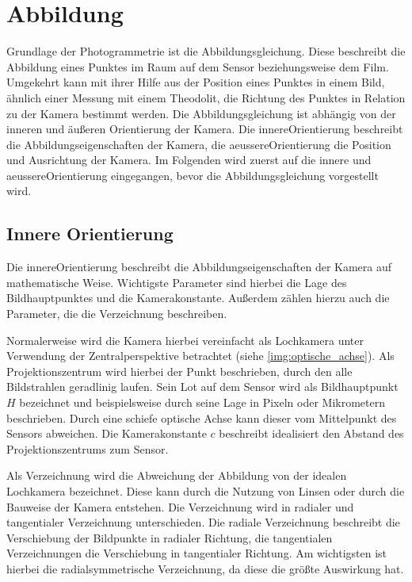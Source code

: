 \documentclass[./00PhotoBox.tex]{subfiles}
\begin{document}
\section{Abbildung}
\label{s:abbildung}
Grundlage der Photogrammetrie ist die Abbildungsgleichung. Diese beschreibt die Abbildung eines Punktes im Raum auf dem Sensor beziehungsweise dem Film. Umgekehrt kann mit ihrer Hilfe aus der Position eines Punktes in einem Bild, ähnlich einer Messung mit einem Theodolit, die Richtung des Punktes in Relation zu der Kamera bestimmt werden. Die Abbildungsgleichung ist abhängig von der inneren und äußeren Orientierung der Kamera. Die \gls{innereOrientierung} beschreibt die Abbildungseigenschaften der Kamera, die \gls{aeussereOrientierung} die Position und Ausrichtung der Kamera. Im Folgenden wird zuerst auf die innere und \gls{aeussereOrientierung} eingegangen, bevor die Abbildungsgleichung vorgestellt wird.

\subsection{Innere Orientierung}
\label{s:innereorientierung}
Die \gls{innereOrientierung} beschreibt die Abbildungseigenschaften der Kamera auf mathematische Weise. Wichtigste Parameter sind hierbei die Lage des \Gls{Bildhauptpunkt}es und die Kamerakonstante. Außerdem zählen hierzu auch die Parameter, die die \Gls{Verzeichnung} beschreiben. \citep[S. 179f]{luhmann}

Normalerweise wird die Kamera hierbei vereinfacht als Lochkamera unter Verwendung der Zentralperspektive betrachtet (siehe \autoref{img:optische_achse}). Als Projektionszentrum wird hierbei der Punkt beschrieben, durch den alle Bildstrahlen geradlinig laufen. Sein Lot auf dem Sensor wird als \Gls{Bildhauptpunkt} $H$ bezeichnet und beispielsweise durch seine Lage in Pixeln oder Mikrometern beschrieben. Durch eine schiefe optische Achse kann dieser vom Mittelpunkt des Sensors abweichen. Die \Gls{Kamerakonstante} $c$ beschreibt idealisiert den Abstand des Projektionszentrums zum Sensor. \citep[S. 177]{luhmann}

Als \Gls{Verzeichnung} wird die Abweichung der Abbildung von der idealen Lochkamera bezeichnet. Diese kann durch die Nutzung von Linsen oder durch die Bauweise der Kamera entstehen. Die \Gls{Verzeichnung} wird in radialer und tangentialer \Gls{Verzeichnung} unterschieden. Die radiale \Gls{Verzeichnung} beschreibt die Verschiebung der Bildpunkte in radialer Richtung, die tangentialen \Gls{Verzeichnung}en die Verschiebung in tangentialer Richtung. Am wichtigsten ist hierbei die radialsymmetrische \Gls{Verzeichnung}, da diese die größte Auswirkung hat. \citep[S. 178]{luhmann}
\end{document}
